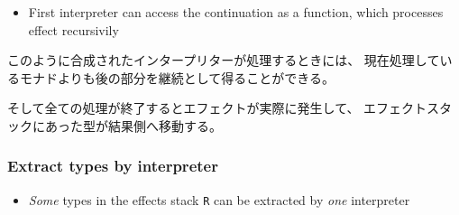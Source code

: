 \begin{frame}
\begin{itemize}
    \item<+-> First interpreter can access the continuation as a function,
    which processes effect recursivily
  \end{itemize}

  \begin{notes}
    \item このように合成されたインタープリターが処理するときには、
    現在処理しているモナドよりも後の部分を継続として得ることができる。

    \item そして全ての処理が終了するとエフェクトが実際に発生して、
    エフェクトスタックにあった型が結果側へ移動する。
  \end{notes}
\end{frame}

\begin{frame}
  \frametitle{Extract types by interpreter}

  \pause
  \begin{itemize}
    \item<+-> \emph{Some} types in the effects stack \lstinline|R| can be
    extracted by \emph{one} interpreter
    \begin{center}
    \end{center}


\end{itemize}
\end{frame}
